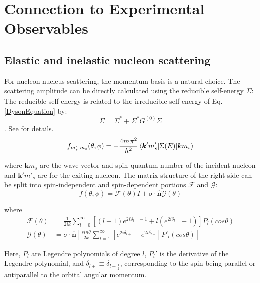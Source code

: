 \section{Connection to Experimental Observables}

\subsection{Elastic and inelastic nucleon scattering}
For nucleon-nucleus scattering, the momentum basis is a natural choice. The scattering amplitude can be directly calculated using the
reducible self-energy $\Sigma$\footnotemark:
\footnotetext
{
    The reducible self-energy is related to the irreducible
    self-energy of Eq. \ref{DysonEquation} by:
    \begin{equation}
        \Sigma = \Sigma^{*} + \Sigma^{*}G^{(0)}\Sigma
    \end{equation}. See \cite{MahzoonPhDThesis} for details.
}
\begin{equation}
    f_{m'_{s},m_{s}}(\theta,\phi) =
    -\frac{4m\pi^{2}}{\hbar^{2}}\braket{\bm{k}'m'_{s}|\Sigma(E)|\bm{k}m_{s}}
\end{equation}

\noindent
where $\bm{k}m_{s}$ are the wave vector and spin quantum number of the incident nucleon and
$\bm{k'}m'_{s}$ are for the exiting nucleon. The matrix structure of the right side can be
split into spin-independent and spin-dependent portions $\mathcal{F}$ and $\mathcal{G}$:
\begin{equation}
    f(\theta,\phi) = \mathcal{F}(\theta)I + \sigma\cdot\bm{\hat{n}}\mathcal{G}(\theta)
\end{equation}

\noindent
where
\begin{equation}
    \begin{split}
        \mathcal{F}(\theta) & = \frac{1}{2ik}\sum_{l=0}^{\infty}\left[(l+1)e^{2i\delta_{l+} - 1} +
        l\left(e^{2i\delta_{l-}}-1\right)\right]P_{l}(cos\theta)\\
        \mathcal{G}(\theta) & =
        \sigma\cdot\bm{\hat{n}}\left[\frac{sin\theta}{2k}\sum_{l=1}^{\infty}[e^{2i\delta_{l+}}-e^{2i\delta_{l-}}]P'_{l}(cos\theta)\right]
    \end{split}
\end{equation}

\noindent
Here, $P_{l}$ are Legendre polynomials of degree $l$, $P_{l}'$ is the derivative of the Legendre
polynomial, and $\delta_{l\pm} \equiv \delta_{l\pm\frac{1}{2}}$, corresponding to the spin being
parallel or antiparallel to the orbital angular momentum.

